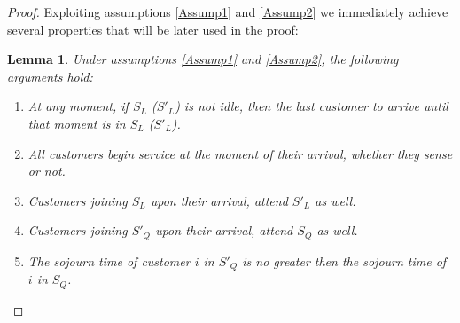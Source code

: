 \documentclass[11pt]{article}
\numberwithin{equation}{section}
\newtheorem{lemma}{Lemma}[proposition]
\begin{document}
\begin{proof}
Exploiting assumptions \ref{Assump1} and \ref{Assump2} we immediately achieve several properties that will be later used in the proof:

\begin{lemma}
Under assumptions {\rm \ref{Assump1}} and {\rm\ref{Assump2}}, the following arguments hold:

\begin{enumerate}[label=(\alph*)]
\rm \item\label{Prop1} \it At any moment, if $S_L$ ($S'_L$) is not idle, then the last customer to arrive until that moment is in $S_L$ ($S'_L$).
\rm \item\label{Prop2} \it All customers begin service at the moment of their arrival, whether they sense or not.
\rm \item\label{Prop3} \it Customers joining $S_L$ upon their arrival,  attend $S'_L$ as well.
\rm \item\label{Prop4} \it Customers joining $S'_Q$ upon their arrival, attend $S_Q$ as well.%
\rm \item\label{Prop5} \it The sojourn time of customer $i$ in $S'_Q$ is no greater then the sojourn time of $i$ in $S_Q$.%

\end{enumerate}
\end{lemma}


\end{proof}
\end{document}

